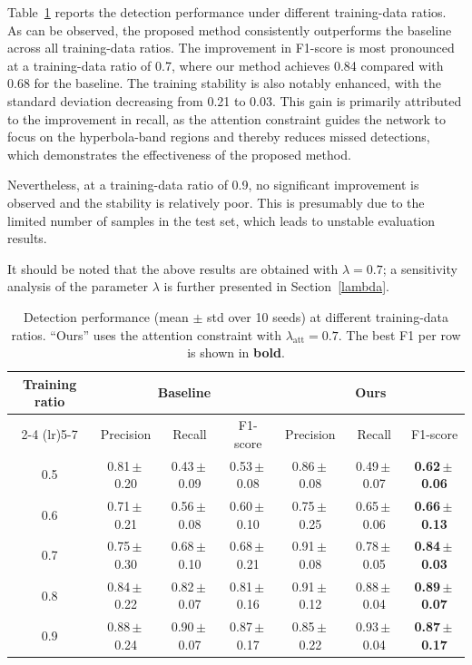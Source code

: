 \documentclass[lettersize,journal]{IEEEtran}
\begin{document}

Table~\ref{tab:bbox_results} reports the detection performance under different training-data ratios. 
As can be observed, the proposed method consistently outperforms the baseline across all training-data ratios. 
The improvement in F1-score is most pronounced at a training-data ratio of 0.7, 
where our method achieves 0.84 compared with 0.68 for the baseline. 
The training stability is also notably enhanced, with the standard deviation decreasing from 0.21 to 0.03. 
This gain is primarily attributed to the improvement in recall, 
as the attention constraint guides the network to focus on the hyperbola-band regions and thereby reduces missed detections, 
which demonstrates the effectiveness of the proposed method.

Nevertheless, at a training-data ratio of 0.9, 
no significant improvement is observed and the stability is relatively poor. 
This is presumably due to the limited number of samples in the test set, 
which leads to unstable evaluation results. 

It should be noted that the above results are obtained with $\lambda=0.7$; 
a sensitivity analysis of the parameter $\lambda$ is further presented in Section~\ref{lambda}.

\begin{table}[]
\centering
\caption{Detection performance (mean $\pm$ std over 10 seeds) at different
training-data ratios. ``Ours'' uses the attention constraint with
$\lambda_{\mathrm{att}}=0.7$. The best F1 per row is shown in \textbf{bold}.}
\label{tab:bbox_results}
\setlength{\tabcolsep}{4pt}
\renewcommand{\arraystretch}{1.2}
\begin{tabular}{c ccc ccc}
\toprule
\multirow{2}{*}{Training ratio} &
\multicolumn{3}{c}{Baseline} &
\multicolumn{3}{c}{Ours} \\
\cmidrule(lr){2-4} \cmidrule(lr){5-7}
 & Precision & Recall & F1-score
 & Precision & Recall & F1-score \\
\midrule
0.5 & 0.81\,$\pm$\,0.20 & 0.43\,$\pm$\,0.09 & 0.53\,$\pm$\,0.08
    & 0.86\,$\pm$\,0.08 & 0.49\,$\pm$\,0.07 & \textbf{0.62\,$\pm$\,0.06} \\
0.6 & 0.71\,$\pm$\,0.21 & 0.56\,$\pm$\,0.08 & 0.60\,$\pm$\,0.10
    & 0.75\,$\pm$\,0.25 & 0.65\,$\pm$\,0.06 & \textbf{0.66\,$\pm$\,0.13} \\
0.7 & 0.75\,$\pm$\,0.30 & 0.68\,$\pm$\,0.10 & 0.68\,$\pm$\,0.21
    & 0.91\,$\pm$\,0.08 & 0.78\,$\pm$\,0.05 & \textbf{0.84\,$\pm$\,0.03} \\
0.8 & 0.84\,$\pm$\,0.22 & 0.82\,$\pm$\,0.07 & 0.81\,$\pm$\,0.16
    & 0.91\,$\pm$\,0.12 & 0.88\,$\pm$\,0.04 & \textbf{0.89\,$\pm$\,0.07} \\
0.9 & 0.88\,$\pm$\,0.24 & 0.90\,$\pm$\,0.07 & 0.87\,$\pm$\,0.17
    & 0.85\,$\pm$\,0.22 & 0.93\,$\pm$\,0.04 & \textbf{0.87\,$\pm$\,0.17} \\
\bottomrule
\end{tabular}
\end{table}
\end{document}
